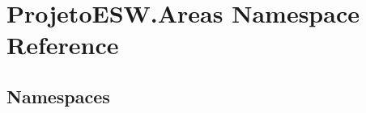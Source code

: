 \hypertarget{namespace_projeto_e_s_w_1_1_areas}{}\section{Projeto\+E\+S\+W.\+Areas Namespace Reference}
\label{namespace_projeto_e_s_w_1_1_areas}
\subsection*{Namespaces}
\begin{DoxyCompactItemize}
\end{DoxyCompactItemize}
